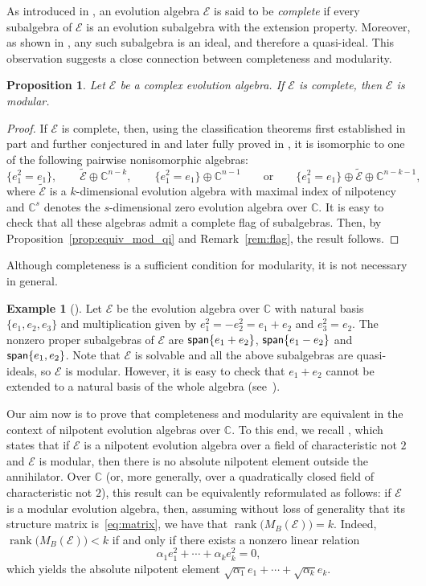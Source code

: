 \documentclass[12pt,reqno]{amsart}
\theoremstyle{plain}%
\newtheorem{proposition}[theorem]{Proposition}%
\theoremstyle{definition}
\newtheorem{example}[theorem]{Example}%
\theoremstyle{remark}
\newcommand{\E}{\mathcal{E}}
\DeclareMathOperator{\spa}{\textup{\textsf{span}}}
\DeclareMathOperator{\rank}{rank}
\numberwithin{equation}{section}
\begin{document}
As introduced in \cite{CKO_19}, an evolution algebra $\E$ is said to be \textit{complete} if every subalgebra of $\E$ is an evolution subalgebra with the extension property. Moreover, as shown in \cite[Proposition~2, p.~24]{Tian_08}, any such subalgebra is an ideal, and therefore a quasi-ideal. This observation suggests a close connection between completeness and modularity. 
\begin{proposition}\label{prop:comp_imp_mod}
	Let $\E$ be a complex evolution algebra. If $\E$ is complete, then $\E$ is modular.
\end{proposition}
\begin{proof}
If $\E$ is complete, then, using the classification theorems first established in part and further conjectured in \cite[Theorem~4.2 and Conjectures~5.2 \&~5.3]{CKO_19} and later fully proved in \cite[Corollary~3.4]{GP_25_complete}, it is isomorphic to one of the following pairwise nonisomorphic algebras:
	\[\{e_1^2=e_1\},\qquad\widetilde{\E}\oplus\mathbb{C}^{n-k},\qquad\{e_1^2=e_1\}\oplus \mathbb{C}^{n-1}\qquad\text{or}\qquad\{e_1^2=e_1\}\oplus \widetilde{\E}\oplus\mathbb{C}^{n-k-1},\]
	where $\widetilde{\E}$ is a $k$-dimensional evolution algebra with maximal index of nilpotency and $\mathbb{C}^s$ denotes the $s$-dimensional zero evolution algebra over $\mathbb{C}$. It is easy to check that all these algebras admit a complete flag of subalgebras. Then, by Proposition~\ref{prop:equiv_mod_qi} and Remark~\ref{rem:flag}, the result follows.
\end{proof}

Although completeness is a sufficient condition for modularity, it is not necessary in general.
\begin{example}[{\cite[Example~5.3]{LPP_25}}]
Let $\E$ be the evolution algebra over $\mathbb{C}$ with natural basis $\{e_1,e_2,e_3\}$ and multiplication given by $e_1^2=-e_2^2=e_1+e_2$ and $e_3^2=e_2$. The nonzero proper subalgebras of $\E$ are $\spa\{e_1+e_2\}$, $\spa\{e_1-e_2\}$ and $\spa\{e_1,e_2\}$. Note that $\E$ is solvable and all the above subalgebras are quasi-ideals, so $\E$ is modular. However, it is easy to check that $e_1+e_2$ cannot be extended to a natural basis of the whole algebra (see~\cite[Theorem~2.4]{BCS_22}).
\end{example}
Our aim now is to prove that completeness and modularity are equivalent in the context of nilpotent evolution algebras over $\mathbb{C}$. 
 To this end, we recall \cite[Proposition~5.4]{LPP_25}, which states that if $\E$ is a nilpotent evolution algebra over a field of characteristic not $2$ and $\E$ is modular, then there is no absolute nilpotent element outside the annihilator. Over $\mathbb{C}$ (or, more generally, over a quadratically closed field of characteristic not $2$), this result can be equivalently reformulated as follows: if $\E$ is a modular evolution algebra, then, assuming without loss of generality that its structure matrix is~\eqref{eq:matrix}, we have that $\rank\big(M_B(\E)\big)=k$. Indeed, $\rank\big(M_B(\E)\big)<k$ if and only if there exists a nonzero linear relation
 \[
 \alpha_1 e_1^2 + \cdots + \alpha_k e_k^2 = 0,
 \]
 which yields the absolute nilpotent element $\sqrt{\alpha_1}e_1 + \cdots + \sqrt{\alpha_k}e_k$.
\end{document}
